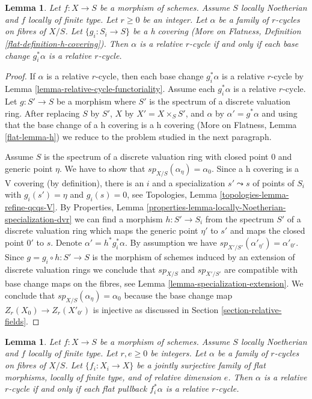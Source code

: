 \documentclass{stacks-project}
\theoremstyle{plain}
\newtheorem{lemma}[subsection]{Lemma}
\theoremstyle{definition}
\theoremstyle{remark}
\numberwithin{equation}{subsection}
\begin{document}
\begin{lemma}
\label{lemma-relative-cycles-h-descent}
Let $f : X \to S$ be a morphism of schemes. Assume $S$ locally Noetherian
and $f$ locally of finite type. Let $r \geq 0$ be an integer. Let $\alpha$
be a family of $r$-cycles on fibres of $X/S$. Let $\{g_i : S_i \to S\}$
be a h covering (More on Flatness, Definition
\ref{flat-definition-h-covering}). Then $\alpha$ is a relative $r$-cycle
if and only if each base change $g_i^*\alpha$ is a relative $r$-cycle.
\end{lemma}

\begin{proof}
If $\alpha$ is a relative $r$-cycle, then each base change $g_i^*\alpha$ is a
relative $r$-cycle by Lemma \ref{lemma-relative-cycle-functoriality}.
Assume each $g_i^*\alpha$ is a relative $r$-cycle.
Let $g : S' \to S$ be a morphism where $S'$ is the spectrum of a discrete
valuation ring. After replacing $S$ by $S'$, $X$ by $X' = X \times_S S'$, and
$\alpha$ by $\alpha' = g^*\alpha$ and using that the base change of a
h covering is a h covering (More on Flatness, Lemma \ref{flat-lemma-h})
we reduce to the problem studied in the next paragraph.

\medskip\noindent
Assume $S$ is the spectrum of a discrete valuation ring with closed
point $0$ and generic point $\eta$. We have to show that
$sp_{X/S}(\alpha_\eta) = \alpha_0$. Since a h covering is a V covering
(by definition), there is an $i$ and a specialization $s' \leadsto s$
of points of $S_i$ with $g_i(s') = \eta$ and $g_i(s) = 0$, see
Topologies, Lemma \ref{topologies-lemma-refine-qcqs-V}. By
Properties, Lemma \ref{properties-lemma-locally-Noetherian-specialization-dvr}
we can find a morphism $h : S' \to S_i$ from the
spectrum $S'$ of a discrete valuation ring which maps
the generic point $\eta'$ to $s'$ and maps
the closed point $0'$ to $s$. Denote $\alpha' = h^*g_i^*\alpha$.
By assumption we have $sp_{X'/S'}(\alpha'_{\eta'}) = \alpha'_{0'}$.
Since $g = g_i \circ h : S' \to S$ is the morphism of schemes
induced by an extension of discrete valuation rings we conclude that
$sp_{X/S}$ and $sp_{X'/S'}$ are compatible with base change maps
on the fibres, see Lemma \ref{lemma-specialization-extension}.
We conclude that $sp_{X/S}(\alpha_\eta) = \alpha_0$ because
the base change map $Z_r(X_0) \to Z_r(X'_{0'})$ is injective
as discussed in Section \ref{section-relative-fields}.
\end{proof}

\begin{lemma}
\label{lemma-families-specialization-fppf-descent}
Let $f : X \to S$ be a morphism of schemes. Assume $S$ locally Noetherian
and $f$ locally of finite type. Let $r, e \geq 0$ be integers.
Let $\alpha$ be a family of $r$-cycles on fibres of $X/S$.
Let $\{f_i : X_i \to X\}$ be a jointly surjective family
of flat morphisms, locally of finite type, and of relative dimension $e$.
Then $\alpha$ is a relative $r$-cycle if and only if each flat
pullback $f_i^*\alpha$ is a relative $r$-cycle.
\end{lemma}
\end{document}
